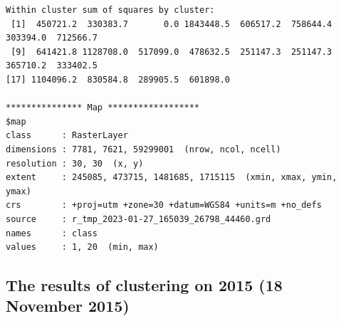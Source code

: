 \documentclass[remotesensing,article,submit,pdftex,moreauthors]{Definitions/mdpi}
\begin{document}
\begin{scriptsize}
\begin{verbatim}
Within cluster sum of squares by cluster:
 [1]  450721.2  330383.7       0.0 1843448.5  606517.2  758644.4  303394.0  712566.7
 [9]  641421.8 1128708.0  517099.0  478632.5  251147.3  251147.3  365710.2  333402.5
[17] 1104096.2  830584.8  289905.5  601898.0

*************** Map ******************
$map
class      : RasterLayer 
dimensions : 7781, 7621, 59299001  (nrow, ncol, ncell)
resolution : 30, 30  (x, y)
extent     : 245085, 473715, 1481685, 1715115  (xmin, xmax, ymin, ymax)
crs        : +proj=utm +zone=30 +datum=WGS84 +units=m +no_defs 
source     : r_tmp_2023-01-27_165039_26798_44460.grd 
names      : class 
values     : 1, 20  (min, max)
\end{verbatim}
\end{scriptsize}

\subsection[\appendixname~\thesubsection]{The results of clustering on 2015 (18 November 2015)}
\end{document}
